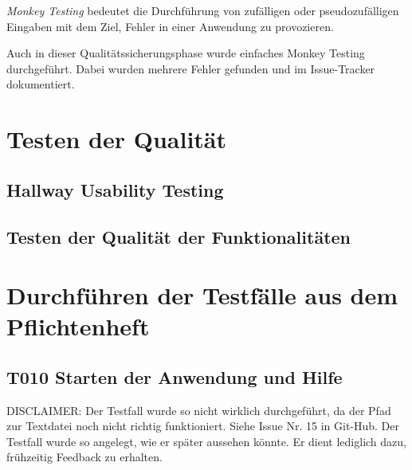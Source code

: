 \documentclass[parskip=full]{scrartcl}
\begin{document}
\textit{Monkey Testing} bedeutet die Durchführung von zufälligen oder pseudozufälligen Eingaben mit dem Ziel, Fehler in einer Anwendung zu provozieren.

Auch in dieser Qualitätssicherungsphase wurde einfaches Monkey Testing durchgeführt. Dabei wurden mehrere Fehler gefunden und im Issue-Tracker dokumentiert.

\clearpage
\section{Testen der Qualität} \label{quali}



\subsection{Hallway Usability Testing}


\subsection{Testen der Qualität der Funktionalitäten}



\section{Durchführen der Testfälle aus dem Pflichtenheft} \label{testszenarien}

\subsection{\textbf{T010} Starten der Anwendung und Hilfe}

DISCLAIMER: Der Testfall wurde so nicht wirklich durchgeführt, da der Pfad zur Textdatei noch nicht richtig funktioniert. Siehe Issue Nr. 15 in Git-Hub. Der Testfall wurde so angelegt, wie er später aussehen könnte. Er dient lediglich dazu, frühzeitig Feedback zu erhalten.
\end{document}
